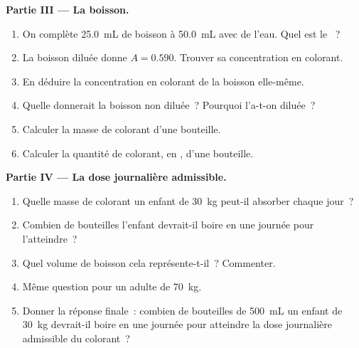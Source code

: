 \begin{problem}
\medskip
\noindent\textbf{Partie III --- La boisson.}
\begin{enumerate}[resume]
  \item On complète \qty{25.0}{mL} de boisson à \qty{50.0}{mL} avec de
        l'eau. Quel est le ~?
  \item La boisson diluée donne $A = 0.590$. Trouver sa concentration en
        colorant.
  \item En déduire la concentration en colorant de la boisson elle-même.
  \item Quelle  donnerait la boisson non diluée~? Pourquoi
        l'a-t-on diluée~?
  \item Calculer la masse de colorant d'une bouteille.
  \item Calculer la quantité de colorant, en , d'une bouteille.
\end{enumerate}

\medskip
\noindent\textbf{Partie IV --- La dose journalière admissible.}
\begin{enumerate}[resume]
  \item Quelle masse de colorant un enfant de \qty{30}{kg} peut-il
        absorber chaque jour~?
  \item Combien de bouteilles l'enfant devrait-il boire en une journée
        pour l'atteindre~?
  \item Quel volume de boisson cela représente-t-il~? Commenter.
  \item Même question pour un adulte de \qty{70}{kg}.
  \item Donner la réponse finale~: combien de bouteilles de
        \qty{500}{mL} un enfant de \qty{30}{kg} devrait-il boire en une
        journée pour atteindre la dose journalière admissible du
        colorant~?
\end{enumerate}
\end{problem}
